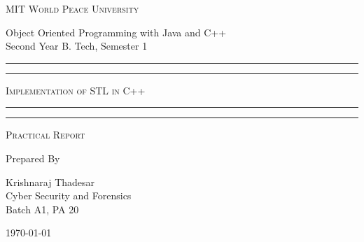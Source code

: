 \documentclass[11pt]{article}
\begin{document}
\begin{titlepage}
	\centering


	\huge\textsc{
		MIT World Peace University
	}\\

	\vspace{0.75\baselineskip} %

	\LARGE{
		Object Oriented Programming with Java and C++\\
		Second Year B. Tech, Semester 1
	}

	\vfill %


	\rule{\textwidth}{1.6pt}\vspace*{-\baselineskip}\vspace*{2pt}
	\rule{\textwidth}{0.6pt}
	\vspace{0.75\baselineskip} %



	\huge{\textsc{
			Implementation of STL in C++
		}} \\



	\vspace{0.5\baselineskip} %
	\rule{\textwidth}{0.6pt}\vspace*{-\baselineskip}\vspace*{2.8pt}
	\rule{\textwidth}{1.6pt}

	\vspace{1\baselineskip} %


	\LARGE\textsc{
		Practical Report
	} %
	\vfill


	Prepared By
	\vspace{0.5\baselineskip} %

	\Large{
		Krishnaraj Thadesar \\
		Cyber Security and Forensics\\
		Batch A1, PA 20
	}


	\vspace{0.5\baselineskip} %
	\today

\end{titlepage}
\end{document}
